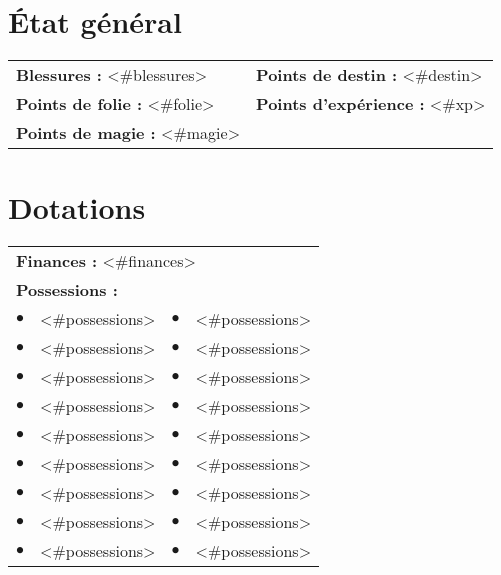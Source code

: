 \documentclass{scrartcl}
\begin{document}
\section*{{\'E}tat général}

\begin{tabular}{X{\arrlenZ} X{\arrlenZ}}
\textbf{Blessures :} <#blessures> & \textbf{Points de destin :} <#destin> \\
\textbf{Points de folie :} <#folie> & \textbf{Points d'expérience :} <#xp> \\
\textbf{Points de magie :} <#magie> & \\
\end{tabular}

\section*{Dotations}

\begin{tabular}{cX{\arrlenZ} cX{\arrlenZ}}
\multicolumn{4}{l}{\textbf{Finances :} <#finances>} \\
\multicolumn{4}{l}{\textbf{Possessions :}} \\
$\bullet$ & <#possessions> & $\bullet$ & <#possessions> \\
$\bullet$ & <#possessions> & $\bullet$ & <#possessions> \\
$\bullet$ & <#possessions> & $\bullet$ & <#possessions> \\
$\bullet$ & <#possessions> & $\bullet$ & <#possessions> \\
$\bullet$ & <#possessions> & $\bullet$ & <#possessions> \\
$\bullet$ & <#possessions> & $\bullet$ & <#possessions> \\
$\bullet$ & <#possessions> & $\bullet$ & <#possessions> \\
$\bullet$ & <#possessions> & $\bullet$ & <#possessions> \\
$\bullet$ & <#possessions> & $\bullet$ & <#possessions> \\
\end{tabular}
\end{document}
